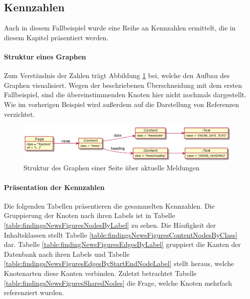 \subsection{Kennzahlen}
    Auch in diesem Fallbeispiel wurde eine Reihe an Kennzahlen ermittelt,
    die in diesem Kapitel präsentiert werden.

    \paragraph{Struktur eines Graphen}
    Zum Verständnis der Zahlen trägt Abbildung \ref{image:findingNewsFiguresDbModel} bei,
    welche den Aufbau des Graphen visualisiert.
    Wegen der beschriebenen Überschneidung mit dem ersten Fallbeispiel,
    sind die übereinstimmenden Knoten hier nicht nochmals dargestellt.
    Wie im vorherigen Beispiel wird außerdem auf die Darstellung von
    Referenzen verzichtet.

    \begin{figure}[htb]
        \centering
        \includegraphics[scale=\imageScalingFactor]{../resources/findings/case-study-2/dbmodel.png}
        \caption{Struktur des Graphen einer Seite über aktuelle Meldungen}
        \label{image:findingNewsFiguresDbModel}
    \end{figure}

    \paragraph{Präsentation der Kennzahlen}
    Die folgenden Tabellen präsentieren die gesammelten Kennzahlen.
    Die Gruppierung der Knoten nach ihren Labels ist in Tabelle
    \ref{table:findingsNewsFiguresNodesByLabel} zu sehen.
    Die Häufigkeit der Inhaltsklassen stellt Tabelle
    \ref{table:findingsNewsFiguresContentNodesByClass} dar.
    Tabelle \ref{table:findingNewsFiguresEdgesByLabel} gruppiert die Kanten der Datenbank
    nach ihren Labels und Tabelle
    \ref{table:findingsNewsFiguresEdgesByStartEndNodeLabel}
    stellt heraus, welche Knotenarten diese Kanten verbinden.
    Zuletzt betrachtet Tabelle \ref{table:findingsNewsFiguresSharedNodes}
    die Frage, welche Knoten mehrfach referenziert wurden.

